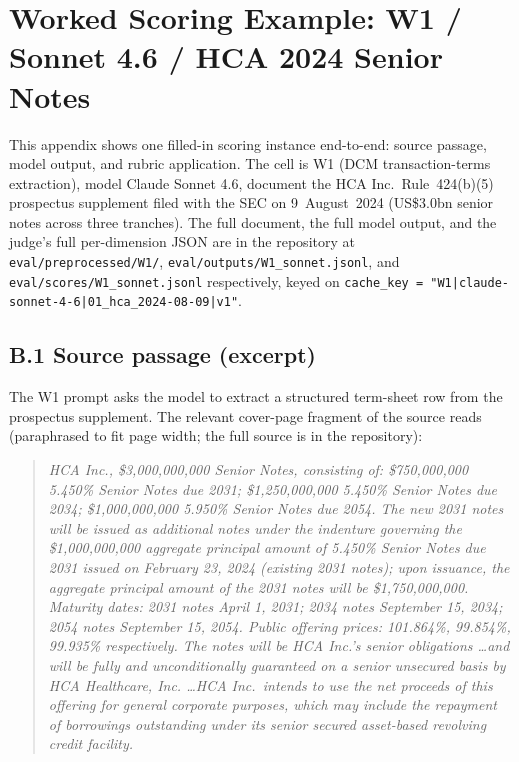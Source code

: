 \documentclass[11pt]{article}
\begin{document}
\section{Worked Scoring Example: W1 / Sonnet 4.6 / HCA 2024 Senior Notes}
\label{app:worked}

This appendix shows one filled-in scoring instance end-to-end: source passage, model output, and rubric application. The cell is W1 (DCM transaction-terms extraction), model Claude Sonnet 4.6, document the HCA Inc.\ Rule~424(b)(5) prospectus supplement filed with the SEC on 9~August~2024 (US\$3.0bn senior notes across three tranches). The full document, the full model output, and the judge's full per-dimension JSON are in the repository at \texttt{eval/preprocessed/W1/}, \texttt{eval/outputs/W1\_sonnet.jsonl}, and \texttt{eval/scores/W1\_sonnet.jsonl} respectively, keyed on \texttt{cache\_key = "W1|claude-sonnet-4-6|01\_hca\_2024-08-09|v1"}.

\subsection*{B.1 Source passage (excerpt)}

The W1 prompt asks the model to extract a structured term-sheet row from the prospectus supplement. The relevant cover-page fragment of the source reads (paraphrased to fit page width; the full source is in the repository):

\begin{quote}\small
\textit{HCA Inc., \$3,000,000,000 Senior Notes, consisting of: \$750,000,000 5.450\% Senior Notes due 2031; \$1,250,000,000 5.450\% Senior Notes due 2034; \$1,000,000,000 5.950\% Senior Notes due 2054. The new 2031 notes will be issued as additional notes under the indenture governing the \$1,000,000,000 aggregate principal amount of 5.450\% Senior Notes due 2031 issued on February 23, 2024 (existing 2031 notes); upon issuance, the aggregate principal amount of the 2031 notes will be \$1,750,000,000. Maturity dates: 2031 notes April 1, 2031; 2034 notes September 15, 2034; 2054 notes September 15, 2054. Public offering prices: 101.864\%, 99.854\%, 99.935\% respectively. The notes will be HCA Inc.'s senior obligations \dots and will be fully and unconditionally guaranteed on a senior unsecured basis by HCA Healthcare, Inc. \dots HCA Inc.\ intends to use the net proceeds of this offering for general corporate purposes, which may include the repayment of borrowings outstanding under its senior secured asset-based revolving credit facility.}
\end{quote}
\end{document}
